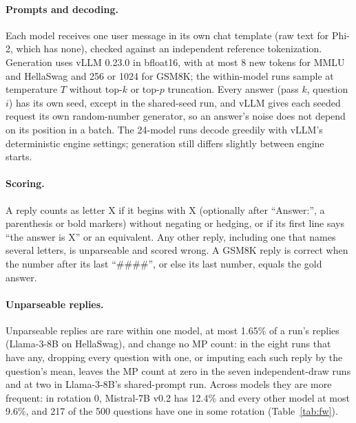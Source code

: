 \documentclass{article}
\theoremstyle{plain}
\theoremstyle{remark}
\begin{document}
\paragraph{Prompts and decoding.} Each model receives one user message
in its own chat template (raw text for Phi-2, which has none), checked
against an independent reference tokenization. Generation uses vLLM 0.23.0 in bfloat16, with at most 8 new
tokens for MMLU and HellaSwag and 256 or 1024 for GSM8K; the
within-model runs sample at temperature $T$ without top-$k$ or top-$p$
truncation. Every answer (pass $k$, question $i$) has its own seed,
except in the shared-seed run, and vLLM gives each seeded request its
own random-number generator, so an answer's noise does not depend on its
position in a batch. The 24-model runs decode greedily with vLLM's
deterministic engine settings; generation still differs slightly between
engine starts.

\paragraph{Scoring.} A reply counts as letter X if it
begins with X (optionally after ``Answer:'', a parenthesis or bold
markers) without negating or hedging, or if its first line says ``the
answer is X'' or an equivalent. Any other reply, including one
that names several letters, is unparseable and scored wrong. A GSM8K
reply is correct when the number after its last ``\#\#\#\#'', or else
its last number, equals the gold answer.

\paragraph{Unparseable replies.} Unparseable replies are rare within one
model, at most 1.65\% of a run's replies (Llama-3-8B on HellaSwag), and
change no MP count: in the eight runs that have any, dropping every
question with one, or imputing each such reply by the question's mean,
leaves the MP count at zero in the seven independent-draw runs and at
two in Llama-3-8B's shared-prompt run. Across models they are more
frequent: in rotation 0, Mistral-7B v0.2 has 12.4\% and every other
model at most 9.6\%, and 217 of the 500 questions have one in some
rotation (Table~\ref{tab:fw}).
\end{document}
